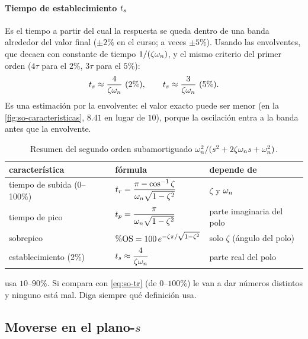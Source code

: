 \paragraph{Tiempo de establecimiento $t_s$} Es el tiempo a partir del cual la respuesta se queda dentro de una banda alrededor del valor final ($\pm2\%$ en el curso; a veces $\pm5\%$). Usando las envolventes, que decaen con constante de tiempo $1/(\zeta\omega_n)$, y el mismo criterio del primer orden ($4\tau$ para el $2\%$, $3\tau$ para el $5\%$):
\begin{equation}
  t_s\approx\frac{4}{\zeta\omega_n}\ (2\%),\qquad t_s\approx\frac{3}{\zeta\omega_n}\ (5\%).
  \label{eq:so-ts}
\end{equation}
Es una estimación por la envolvente: el valor exacto puede ser menor (en la \cref{fig:so-caracteristicas}, $8.41$ en lugar de $10$), porque la oscilación entra a la banda antes que la envolvente.

\begin{table}[ht]
\centering
\caption{Resumen del segundo orden subamortiguado $\omega_n^2/(s^2+2\zeta\omega_n s+\omega_n^2)$.}
\label{tab:so-resumen}
\renewcommand{\arraystretch}{1.9}
\begin{tabular}{@{}lll@{}}
\toprule
característica & fórmula & depende de\\
\midrule
tiempo de subida (0--100\%) & $t_r=\dfrac{\pi-\cos^{-1}\zeta}{\omega_n\sqrt{1-\zeta^2}}$ & $\zeta$ y $\omega_n$\\
tiempo de pico & $t_p=\dfrac{\pi}{\omega_n\sqrt{1-\zeta^2}}$ & parte imaginaria del polo\\
sobrepico & $\%\mathrm{OS}=100\,e^{-\zeta\pi/\sqrt{1-\zeta^2}}$ & solo $\zeta$ (ángulo del polo)\\
establecimiento (2\%) & $t_s\approx\dfrac{4}{\zeta\omega_n}$ & parte real del polo\\
\bottomrule
\end{tabular}
\end{table}


\begin{cuidado}
 usa $10$--$90\%$. Si compara con \eqref{eq:so-tr} (de $0$--$100\%$) le van a dar números distintos y ninguno está mal. Diga siempre qué definición usa.
\end{cuidado}

\subsection{Moverse en el plano-$s$}

